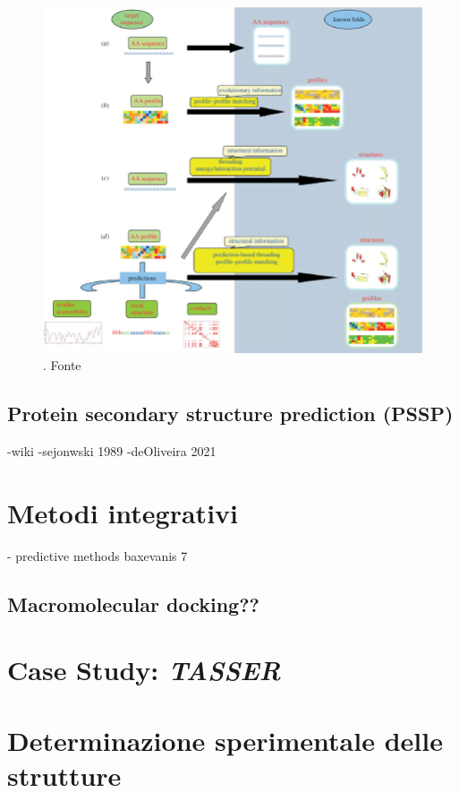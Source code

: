 \begin{figure}[!htb]
	\centering
	\includegraphics[scale=0.53]{images/threading-mappa.png}
	\caption{. Fonte\cite{joseph2014local}}
	\label{fig:fold-recognition}
\end{figure}


\subsection{Protein secondary structure prediction (PSSP)}
-wiki
-sejonwski 1989
-deOliveira 2021


\section{Metodi integrativi} \label{sec:metodi-integrativi}

- predictive methods
baxevanis 7

\subsection{Macromolecular docking??}


\section{Case Study: \textit{TASSER}}


\section{Determinazione sperimentale delle strutture} \label{sec:experimentally-guided-prediction}

